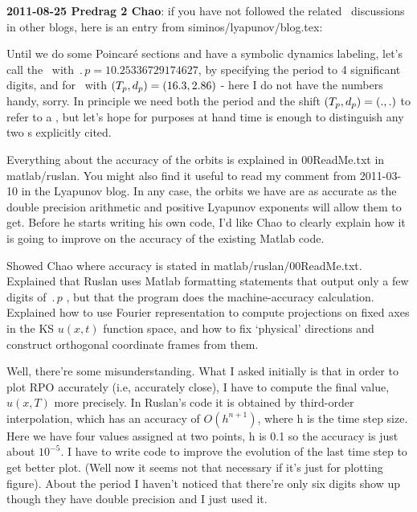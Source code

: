 \begin{description}
{\bf 2011-08-25 Predrag 2 Chao}: if you have not followed the related
\KSe\ discussions in other blogs, here is an entry from
siminos/lyapunov/blog.tex:

Until we do some Poincar\'e sections and have a symbolic dynamics
labeling, let's call  the \po\ with
$\period{p}=10.25336729174627$, by specifying the period to 4 significant
digits, and  for \rpo\ with
$({T_{p}},d_p)=(16.3,2.86)$ - here I do not have the numbers
handy, sorry. In principle we need both the period and the shift
$({T_{p}},d_p)=(.,.)$ to refer to a \rpo, but let's hope for
purposes at hand time is enough to distinguish any two \rpo s explicitly
cited.

\item[2011-10-24 Ruslan 2 Predrag] Everything about the accuracy of the
orbits is explained in 00ReadMe.txt in matlab/ruslan. You might also
find it useful to read my comment from 2011-03-10 in the Lyapunov blog.
In any case, the orbits we have are as accurate as the double precision
arithmetic and positive Lyapunov exponents will allow them to get. Before
he starts writing his own code, I'd like Chao to clearly explain how it
is going to improve on the accuracy of the existing Matlab code.


\item[2011-08-25 Predrag 2 Ruslan] Showed Chao where accuracy is stated
in matlab/ruslan/00ReadMe.txt. Explained that Ruslan uses Matlab
formatting statements that output only a few digits of $\period{p}$ \etc,
but that the program does the machine-accuracy calculation. Explained how
to use Fourier representation to compute projections on fixed axes in the
KS $u(x,t)$ function space, and how to fix `physical' directions and
construct orthogonal coordinate frames from them.


\item[2011-10-24 Chao to Ruslan, Predrag] Well, there're some
misunderstanding. What I asked initially is that in order to plot RPO
accurately (i.e, accurately close), I have to compute the final value,
$u(x,T)$ more precisely. In Ruslan's code it is obtained by third-order
interpolation, which has an accuracy of $O(h^{n+1})$, where h is the time
step size. Here we have four values assigned at two points, h is 0.1 so
the accuracy is just about $10^{-5}$. I have to write code to improve the
evolution of the last time step to get better plot. (Well now it seems not
that necessary if it's just for plotting figure). About the period I
haven't noticed that there're only six digits show up though they have
double precision and I just used it.


\end{description}
